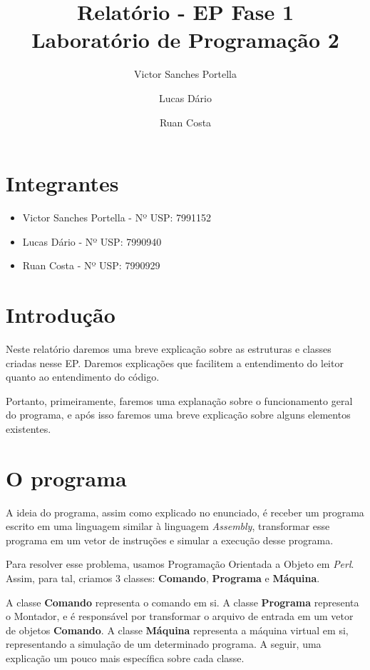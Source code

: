 \documentclass[11pt]{article}
\title{Relatório - EP Fase 1 \\ Laboratório de Programação 2}
\author{Victor Sanches Portella \and Lucas Dário \and Ruan Costa}
\begin{document}
\maketitle

\section{Integrantes}

\begin{itemize}

\item Victor Sanches Portella - Nº USP: 7991152

\item Lucas Dário - Nº USP: 7990940

\item Ruan Costa - Nº USP: 7990929

\end{itemize}


\section{Introdução}

Neste relatório daremos uma breve explicação sobre as estruturas e classes
criadas nesse EP. Daremos explicações que facilitem a entendimento do leitor quanto ao entendimento do código.

Portanto, primeiramente, faremos uma explanação sobre o funcionamento geral do programa, e após isso faremos uma breve explicação sobre alguns elementos existentes.

\section{O programa}

A ideia do programa, assim como explicado no enunciado, é receber um programa escrito em uma linguagem similar à linguagem \emph{Assembly}, transformar esse programa em um vetor de instruções e simular a execução desse programa.

Para resolver esse problema, usamos Programação Orientada a Objeto em \emph{Perl}. Assim, para tal, criamos 3 classes: \textbf{\color{red}Comando}, \textbf{\color{red}Programa} e \textbf{\color{red}Máquina}.

A classe \textbf{\color{red}Comando} representa o comando em si. A classe \textbf{\color{red}Programa} representa o Montador, e é responsável por transformar o arquivo de entrada em um vetor de objetos \textbf{\color{red}Comando}. A classe \textbf{\color{red}Máquina} representa a máquina virtual em si, representando a simulação de um determinado programa. A seguir, uma explicação um pouco mais específica sobre cada classe.
\end{document}
